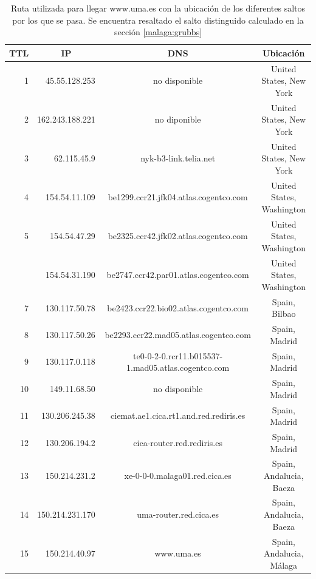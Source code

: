 \begin{table}[H]
    \begin{center}
        \begin{tabular}{| r | r | c | c |}
  \hline
  {\bf TTL} & \multicolumn{1}{|c|}{\bf IP} & {\bf DNS} & {\bf Ubicación}\\
  \hline
\hline 1 & 45.55.128.253 & no disponible & United States, New York\\
\hline 2 & 162.243.188.221 & no diponible & United States, New York\\
\hline 3 & 62.115.45.9 & nyk-b3-link.telia.net & United States, New York\\
\hline 4 & 154.54.11.109 & be1299.ccr21.jfk04.atlas.cogentco.com & United States, Washington\\
\hline 5 & 154.54.47.29 & be2325.ccr42.jfk02.atlas.cogentco.com & United States, Washington\\
\rowcolor{blue!25}\hline 6 & 154.54.31.190 & be2747.ccr42.par01.atlas.cogentco.com & United States, Washington\\
\hline 7 & 130.117.50.78 & be2423.ccr22.bio02.atlas.cogentco.com & Spain, Bilbao\\
\hline 8 & 130.117.50.26 & be2293.ccr22.mad05.atlas.cogentco.com & Spain, Madrid\\
\hline 9 & 130.117.0.118 & te0-0-2-0.rcr11.b015537-1.mad05.atlas.cogentco.com & Spain, Madrid\\
\hline 10 & 149.11.68.50 & no disponible & Spain, Madrid\\
\hline 11 & 130.206.245.38 & ciemat.ae1.cica.rt1.and.red.rediris.es & Spain, Madrid\\
\hline 12 & 130.206.194.2 & cica-router.red.rediris.es & Spain, Madrid\\
\hline 13 & 150.214.231.2 & xe-0-0-0.malaga01.red.cica.es & Spain, Andalucia, Baeza\\
\hline 14 & 150.214.231.170 & uma-router.red.cica.es & Spain, Andalucia, Baeza\\
\hline 15 & 150.214.40.97 & www.uma.es & Spain, Andalucia, M\'alaga\\
\hline
        \end{tabular}
        \caption{Ruta utilizada para llegar www.uma.es con la ubicación de los diferentes saltos por los que se pasa. Se encuentra resaltado el salto distinguido calculado en la sección \ref{malaga:grubbs}}
        \label{table:malaga} 
    \end{center}
\end{table}

